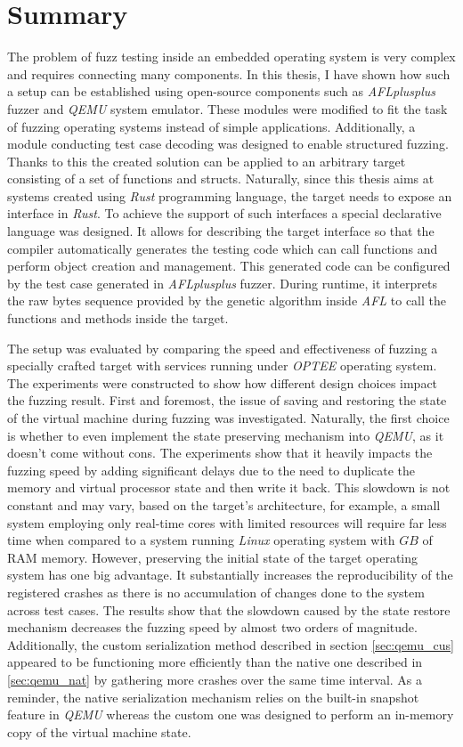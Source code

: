 \cleardoublepage
\section{Summary} \label{chap:summ}
The problem of fuzz testing inside an embedded operating system is very complex and requires connecting many components. In this thesis, I have shown how such a setup can be established using open-source components such as \textit{AFLplusplus} fuzzer and \textit{QEMU} system emulator. These modules were modified to fit the task of fuzzing operating systems instead of simple applications. Additionally, a module conducting test case decoding was designed to enable structured fuzzing. Thanks to this the created solution can be applied to an arbitrary target consisting of a set of functions and structs. Naturally, since this thesis aims at systems created using \textit{Rust} programming language, the target needs to expose an interface in \textit{Rust}. To achieve the support of such interfaces a special declarative language was designed. It allows for describing the target interface so that the compiler automatically generates the testing code which can call functions and perform object creation and management. This generated code can be configured by the test case generated in \textit{AFLplusplus} fuzzer. During runtime, it interprets the raw bytes sequence provided by the genetic algorithm inside \textit{AFL} to call the functions and methods inside the target.

The setup was evaluated by comparing the speed and effectiveness of fuzzing a specially crafted target with services running under \textit{OPTEE} operating system. The experiments were constructed to show how different design choices impact the fuzzing result. First and foremost, the issue of saving and restoring the state of the virtual machine during fuzzing was investigated. Naturally, the first choice is whether to even implement the state preserving mechanism into \textit{QEMU}, as it doesn't come without cons. The experiments show that it heavily impacts the fuzzing speed by adding significant delays due to the need to duplicate the memory and virtual processor state and then write it back. This slowdown is not constant and may vary, based on the target's architecture, for example, a small system employing only real-time cores with limited resources will require far less time when compared to a system running \textit{Linux} operating system with $GB$ of RAM memory. However, preserving the initial state of the target operating system has one big advantage. It substantially increases the reproducibility of the registered crashes as there is no accumulation of changes done to the system across test cases. The results show that the slowdown caused by the state restore mechanism decreases the fuzzing speed by almost two orders of magnitude. Additionally, the custom serialization method described in section \ref{sec:qemu_cus} appeared to be functioning more efficiently than the native one described in \ref{sec:qemu_nat} by gathering more crashes over the same time interval. As a reminder, the native serialization mechanism relies on the built-in snapshot feature in \textit{QEMU} whereas the custom one was designed to perform an in-memory copy of the virtual machine state.

